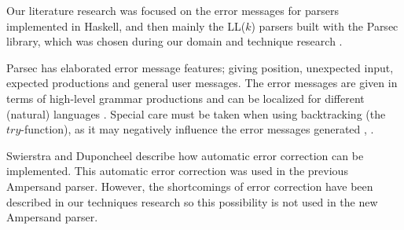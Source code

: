 Our literature research was focused on the error messages for parsers implemented in Haskell, and then mainly the LL($k$) parsers built with the Parsec library, which was chosen during our domain and technique research .

Parsec has elaborated error message features; giving position, unexpected input, expected productions and general user messages.
The error messages are given in terms of high-level grammar productions and can be localized for different (natural) languages .
Special care must be taken when using backtracking (the $try$-function), as it may negatively influence the error messages generated ,  .

Swierstra and Duponcheel  describe how automatic error correction can be implemented.
This automatic error correction was used in the previous Ampersand parser.
However, the shortcomings of error correction have been described in our techniques research \cite{parsing} so this possibility is not used in the new Ampersand parser.
